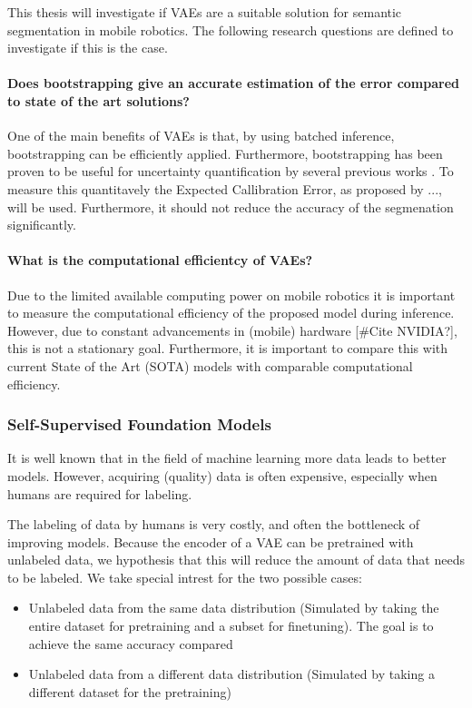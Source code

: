 This thesis will investigate if VAEs are a suitable solution for semantic segmentation in mobile robotics. The following research questions are defined to investigate if this is the case.

\paragraph*{Does bootstrapping give an accurate estimation of the error compared to state of the art solutions?} One of the main benefits of VAEs is that, by using batched inference, bootstrapping can be efficiently applied. Furthermore, bootstrapping has been proven to be useful for uncertainty quantification by several previous works \cite{chen2018use,kohl2018probabilistic,edupuganti2021uq_mri}. To measure this quantitavely the Expected Callibration Error, as proposed by ..., will be used. Furthermore, it should not reduce the accuracy of the segmenation significantly.

\paragraph*{What is the computational efficientcy of VAEs?} Due to the limited available computing power on mobile robotics it is important to measure the computational efficiency of the proposed model during inference. However, due to constant advancements in (mobile) hardware [\#Cite NVIDIA?], this is not a stationary goal. Furthermore, it is important to compare this with current State of the Art (SOTA) models with comparable computational efficiency.


\subsubsection{Self-Supervised Foundation Models}
It is well known that in the field of machine learning more data leads to better models. However, acquiring (quality) data is often expensive, especially when humans are required for labeling.

The labeling of data by humans is very costly, and often the bottleneck of improving models. Because the encoder of a VAE can be pretrained with unlabeled data, we hypothesis that this will reduce the amount of data that needs to be labeled. We take special intrest for the two possible cases:
\begin{itemize}
    \item Unlabeled data from the same data distribution (Simulated by taking the entire dataset for pretraining and a subset for finetuning). The goal is to achieve the same accuracy compared
    \item Unlabeled data from a different data distribution (Simulated by taking a different dataset for the pretraining)
\end{itemize}



